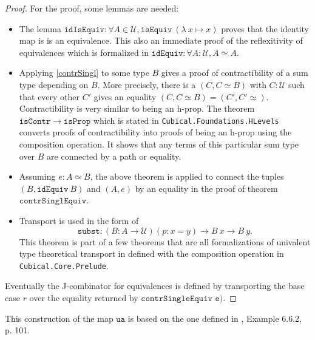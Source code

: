 \documentclass[12pt,a4paper,twoside,xetex]{book} %
\newcommand{\op}[1]{\mathtt{#1}}
\newcommand{\type}{\mathcal{U}}
\begin{document}
\begin{proof}

For the proof, some lemmas are needed: 
\begin{itemize}

\item The lemma $\op{idIsEquiv}: \forall A \in \type , \op{isEquiv} \  
(\lambda \ x \mapsto x)$ proves that the identity map is is an equivalence. This also an immediate proof of the reflexitivity of equivalences which is formalized in  $\op{idEquiv}: \forall A : \type, A 
\simeq A$.

\item Applying \cref{contrSingl} to some type $B$ gives a proof of 
contractibility of a sum type depending on $B$. More precisely, there is a $(C, 
C \simeq B)$ with $C:\mathcal{U}$ such that every other $C'$ gives an equality 
$(C,C \simeq B) = (C',C'\simeq)$. Contractibility is very similar to being an 
h-prop. The theorem $\op{isContr} \rightarrow \op{isProp}$ which is stated in 
\texttt{Cubical.Foundations.HLevels} converts proofs of contractibility into 
proofs of being an h-prop using the composition operation. It shows that any 
terms of this particular sum type over $B$ are connected by a path or equality.


\item   Assuming $e : A \simeq B$, the above theorem is applied to connect the 
tuples $(B, \op{idEquiv} \ B)$ and $(A, e)$ by an equality in the proof of 
theorem $\op{contrSinglEquiv}$.

\item Transport is used in the form of $$\op{subst} : \left(B : A \rightarrow \type 
\right) (p : x = y) \rightarrow B \ x \rightarrow B \ y.$$ This theorem is part 
of a few theorems that are all formalizations of univalent type theoretical 
transport in defined with the composition operation in 
\texttt{Cubical.Core.Prelude}.

\end{itemize}

Eventually the J-combinator for equivalences is defined by transporting the 
base case $r$ over the equality returned by $\texttt{contrSingleEquiv e)}$.

\end{proof}

This construction of the map $\op{ua}$ is based on the one defined in 
\cite{Huber2016}, Example 6.6.2, p. 101.
\end{document}
